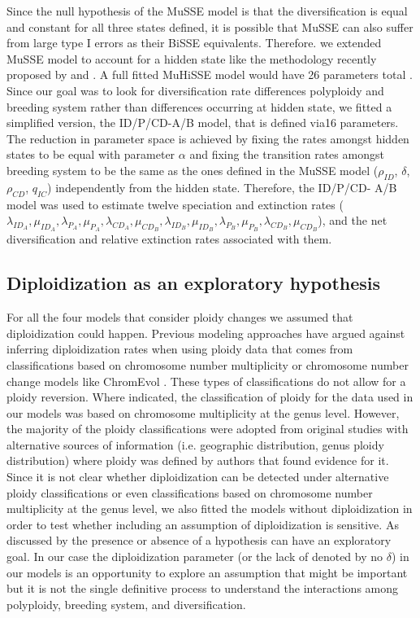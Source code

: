 Since the null hypothesis of the MuSSE model is that the diversification is equal and constant for all three states defined, it is possible that MuSSE can also suffer from large type I errors as their BiSSE equivalents. Therefore. we extended MuSSE model to account for a hidden state like the methodology recently proposed by \citet{caetano_2018} and \citet{herrera_2018}. A full fitted MuHiSSE model would have 26 parameters total \citep{herrera_2018}. Since our goal was to look for diversification rate differences polyploidy and breeding system rather than differences occurring at  hidden state, we fitted a simplified version, the  ID/P/CD-A/B model, that is defined via16 parameters. The reduction in parameter space is achieved by fixing the rates amongst hidden states to be equal with parameter $\alpha$ and fixing the transition rates amongst breeding system to be the same as  the ones defined in the MuSSE model ($\rho_{ID}$,  $\delta$,  $\rho_{CD}$,  $q_{IC}$) independently from the hidden state.   Therefore, the ID/P/CD- A/B model was used to estimate twelve speciation and extinction rates ($\lambda_{ID_A}, \mu_{ID_A},\lambda_{P_A},\mu_{P_A}, \lambda_{CD_A},\mu_{CD_B},\lambda_{ID_B}, \mu_{ID_B},\lambda_{P_B},\mu_{P_B}, \lambda_{CD_B},\mu_{CD_B}$), and the net diversification and relative extinction rates associated with them.\newline

\subsection{Diploidization as an exploratory hypothesis}

For all the four models that consider ploidy changes we assumed that diploidization could happen. Previous modeling approaches \citep{mayrose_2011} have argued against inferring diploidization rates when using ploidy data that comes from classifications based on chromosome number multiplicity or chromosome number change models like ChromEvol \citep{mayrose_2010}. These types of classifications do not allow for a ploidy reversion. Where indicated, the classification of ploidy for the data used in our models was based on chromosome multiplicity at the genus level. However, the majority of the ploidy classifications were adopted from original studies with alternative sources of information (i.e. geographic distribution, genus ploidy distribution) where ploidy was defined by authors that found evidence for it. Since it is not clear whether diploidization can be detected under alternative ploidy classifications or even classifications based on chromosome number multiplicity at the genus level, we also fitted the models without diploidization in order to test  whether including an assumption of diploidization is sensitive. As discussed by \citet{servedio_2014}  the presence or absence of a hypothesis can have an exploratory goal. In our case the diploidization parameter (or the lack of denoted by no $\delta$) in our models  is an opportunity to explore an assumption that might be important but it is not the single definitive process to understand the interactions among polyploidy, breeding system, and diversification.

